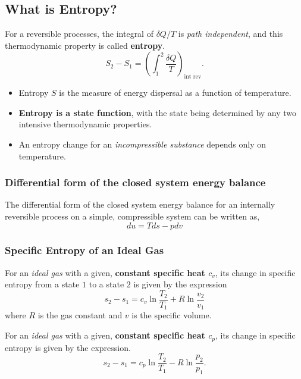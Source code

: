 \subsection{What is Entropy?}
For a reversible processes, the integral of $\delta Q/T$ is \emph{path independent}, and this thermodynamic property is called \textbf{entropy}.
\begin{equation}
S_2 - S_1 = \left(\int_1^2 \frac{\delta Q}{T}\right)_{\text{int rev}}.
\end{equation}
\begin{itemize}
    \item Entropy $S$ is the measure of energy dispersal as a function of temperature.
    \item \textbf{Entropy is a state function}, with the state being determined by any two intensive thermodynamic properties.
    \item  An entropy change for an \emph{incompressible substance} depends only on temperature.
\end{itemize}

\subsubsection{Differential form of the closed system energy balance}
The differential form of the closed system energy balance for an internally reversible process on a simple, compressible system can be written as,
\begin{equation}\label{eq:fund}
du = T ds - pdv
\end{equation}
\subsubsection{Specific Entropy of an Ideal Gas}
For an \emph{ideal gas} with a given, \textbf{constant specific heat $c_v$}, its change in specific entropy from a state $1$ to a state $2$ is given by the expression
\begin{equation}
s_2 - s_1 = c_v\ln\frac{T_2}{T_1}+ R \ln\frac{v_2}{v_1}
\end{equation}
where $R$ is the gas constant and $v$ is the specific volume. 
\vspace{14pt}

\noindent For an \emph{ideal gas} with a given, \textbf{constant specific heat $c_p$}, its change in specific entropy is given by the expression.
\begin{equation}
s_2 - s_1 = c_p\ln\frac{T_2}{T_1}- R \ln\frac{p_2}{p_1}.
\end{equation}

